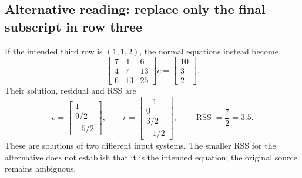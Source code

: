 \documentclass[11pt,a4paper]{article}
\newcommand{\RSS}{\operatorname{RSS}}
\begin{document}
\subsection{Alternative reading: replace only the final subscript in row three}
If the intended third row is $(1,1,2)$, the normal equations instead become
\[
\begin{bmatrix}7 & 4 & 6\\4 & 7 & 13\\6 & 13 & 25\end{bmatrix}c=\begin{bmatrix}10\\3\\2\end{bmatrix}.
\]
Their solution, residual and RSS are
\[
c=\begin{bmatrix}1\\9/2\\-5/2\end{bmatrix},\qquad
r=\begin{bmatrix}-1\\0\\3/2\\-1/2\end{bmatrix},\qquad
\RSS=\frac72=3.5.
\]
These are solutions of two different input systems. The smaller RSS for the alternative does not establish that it is the intended equation; the original source remains ambiguous.

\clearpage
\end{document}
